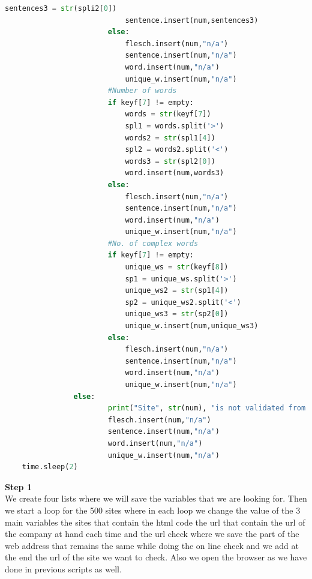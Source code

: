 \documentclass{article}
\begin{document}
\begin{lstlisting}[language=Python]
                            sentences3 = str(spli2[0])
                            sentence.insert(num,sentences3)
                        else:
                            flesch.insert(num,"n/a")
                            sentence.insert(num,"n/a")
                            word.insert(num,"n/a")
                            unique_w.insert(num,"n/a")  
                        #Number of words
                        if keyf[7] != empty:
                            words = str(keyf[7])
                            spl1 = words.split('>')
                            words2 = str(spl1[4])
                            spl2 = words2.split('<')
                            words3 = str(spl2[0])
                            word.insert(num,words3)
                        else:
                            flesch.insert(num,"n/a")
                            sentence.insert(num,"n/a")
                            word.insert(num,"n/a")
                            unique_w.insert(num,"n/a")  
                        #No. of complex words
                        if keyf[7] != empty:
                            unique_ws = str(keyf[8])
                            sp1 = unique_ws.split('>')
                            unique_ws2 = str(sp1[4])
                            sp2 = unique_ws2.split('<')
                            unique_ws3 = str(sp2[0])
                            unique_w.insert(num,unique_ws3)
                        else:
                            flesch.insert(num,"n/a")
                            sentence.insert(num,"n/a")
                            word.insert(num,"n/a")
                            unique_w.insert(num,"n/a")  
                else:
                        print("Site", str(num), "is not validated from check 2")
                        flesch.insert(num,"n/a")
                        sentence.insert(num,"n/a")
                        word.insert(num,"n/a")
                        unique_w.insert(num,"n/a")            
    time.sleep(2)
\end{lstlisting}
\textbf{Step 1} \\We create four lists where we will save the variables that we are looking for. Then we start a loop for the 500 sites where in each loop we change the value of the 3 main variables the sites that contain the html code the url that contain the url of the company at hand each time and the url check where we save the part of the web address that remains the same while doing the on line check and we add at the end the url of the site we want to check. Also we open the browser as we have done in previous scripts as well.\\\\
\end{document}
